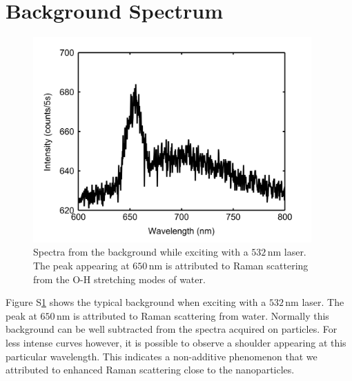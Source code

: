 \documentclass[journal=jpccck]{achemso}
\newcommand{\nm}{\ensuremath{\,\textrm{nm}}}
\begin{document}
\section{Background Spectrum}
\begin{figure}[htp]
 \centering
 \includegraphics[width=0.95\textwidth]{Figures/04_Supporting/03_Background/background.png}
 \caption{Spectra from the background while exciting with a $532\nm$ laser. The
 peak appearing at $650\nm$ is attributed to Raman scattering from the O-H stretching modes of water.}
 \label{fig:Background}
\end{figure}

Figure S\ref{fig:Background} shows the typical background when exciting with a
$532\nm$ laser. The peak at $650\nm$ is attributed to Raman scattering from
water. Normally this background can be well subtracted from the spectra acquired
on particles. For less intense curves however, it is possible to observe a
shoulder appearing at this particular wavelength. This indicates a non-additive
phenomenon that we attributed to enhanced Raman scattering close to the
nanoparticles.
\end{document}
